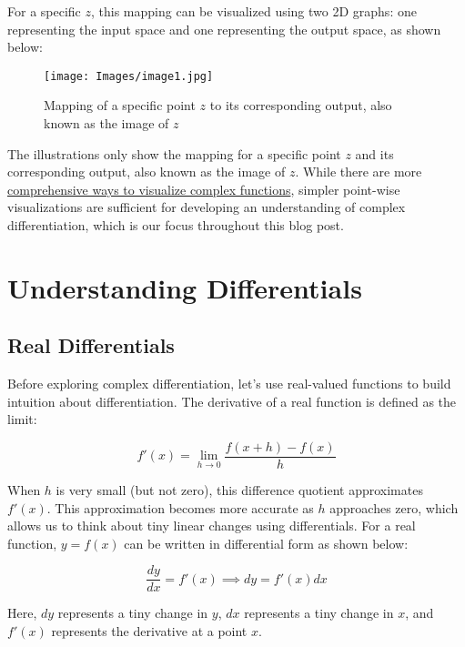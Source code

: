 \documentclass[a4paper,10.5pt]{article}
\begin{document}
For a specific $z$, this mapping can be visualized using two 2D graphs: one representing the input space and one representing the output space, as shown below:
\begin{figure}[H]
    \centering
    \texttt{[image: Images/image1.jpg]}
    \caption{Mapping of a specific point $z$ to its corresponding output, also known as the image of $z$}
    \label{fig:galaxy}
\end{figure}

The illustrations only show the mapping for a specific point $z$ and its corresponding output, also known as the image of $z$. While there are more \href{https://www.youtube.com/watch?v=NtoIXhUgqSk&list=PLDcSwjT2BF_UDdkQ3KQjX5SRQ2DLLwv0R&index=5}{comprehensive ways to visualize complex functions}, simpler point-wise visualizations are sufficient for developing an understanding of complex differentiation, which is our focus throughout this blog post.

\section{Understanding Differentials}

\subsection{Real Differentials}

Before exploring complex differentiation, let’s use real-valued functions to build intuition about differentiation. The derivative of a real function is defined as the limit:

\begin{equation}
    f'(x) = \lim_{h \to 0} \frac{f(x+h) - f(x)}{h}
\end{equation}

When $h$ is very small (but not zero), this difference quotient approximates $f'(x)$. This approximation becomes more accurate as $h$ approaches zero, which allows us to think about tiny linear changes using differentials. For a real function, $y = f(x)$ can be written in differential form as shown below:

\begin{equation}
    \frac{dy}{dx} = f'(x) \implies dy = f'(x)dx
\end{equation}

Here, $dy$ represents a tiny change in $y$, $dx$ represents a tiny change in $x$, and $f'(x)$ represents the derivative at a point $x$.
\end{document}

